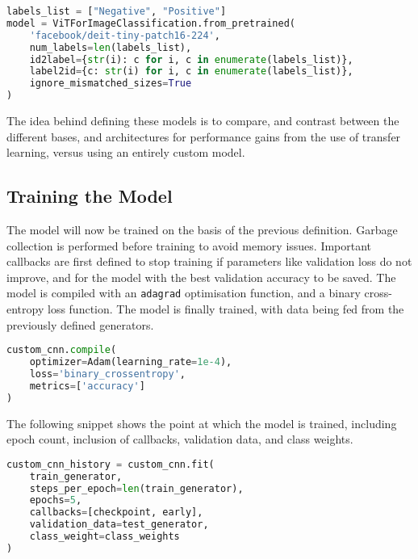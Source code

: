 \documentclass[../main]{subfiles}
\begin{document}
\begin{lstlisting}[language=Python, caption={Vision Transformer model definition.}]
labels_list = ["Negative", "Positive"]
model = ViTForImageClassification.from_pretrained(
    'facebook/deit-tiny-patch16-224',
    num_labels=len(labels_list),
    id2label={str(i): c for i, c in enumerate(labels_list)},
    label2id={c: str(i) for i, c in enumerate(labels_list)},
    ignore_mismatched_sizes=True
)
\end{lstlisting}


\noindent The idea behind defining these models is to compare, and contrast
between the different bases, and architectures for performance gains from the
use of transfer learning, versus using an entirely custom model.

\subsection{Training the Model}
The model will now be trained on the basis of the previous definition. Garbage
collection is performed before training to avoid memory issues. Important
callbacks are first defined to stop training if parameters like validation loss
do not improve, and for the model with the best validation accuracy to be saved. The
model is compiled with an \texttt{adagrad} optimisation function, and a binary
cross-entropy loss function. The model is finally trained, with data being fed
from the previously defined generators.

\begin{lstlisting}[language=Python, caption={Compiling the custom CNN using the Adam optimiser, and a binary cross-entropy loss function.}]
custom_cnn.compile(
    optimizer=Adam(learning_rate=1e-4),
    loss='binary_crossentropy',
    metrics=['accuracy']
)
\end{lstlisting}

\noindent The following snippet shows the point at which the model is trained,
including epoch count, inclusion of callbacks, validation data, and class
weights.

\begin{lstlisting}[language=Python, caption={Model training of the custom CNN.}]
custom_cnn_history = custom_cnn.fit(
    train_generator,
    steps_per_epoch=len(train_generator),
    epochs=5,
    callbacks=[checkpoint, early],
    validation_data=test_generator,
    class_weight=class_weights
)
\end{lstlisting}
\end{document}
